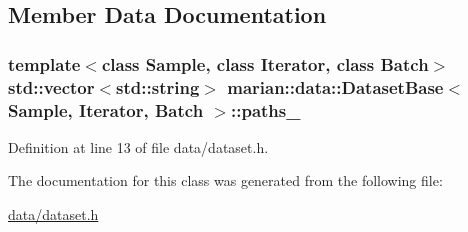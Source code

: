 \subsection{Member Data Documentation}
\subsubsection[{\texorpdfstring{paths\+\_\+}{paths_}}]{\setlength{\rightskip}{0pt plus 5cm}template$<$class Sample, class Iterator, class Batch$>$ std\+::vector$<$std\+::string$>$ {\bf marian\+::data\+::\+Dataset\+Base}$<$ Sample, Iterator, {\bf Batch} $>$\+::paths\+\_\+\hspace{0.3cm}{\ttfamily [protected]}}\hypertarget{classmarian_1_1data_1_1DatasetBase_ac00940207a65687f7ea491333aedc1c1}{}\label{classmarian_1_1data_1_1DatasetBase_ac00940207a65687f7ea491333aedc1c1}


Definition at line 13 of file data/dataset.\+h.



The documentation for this class was generated from the following file\+:\begin{DoxyCompactItemize}
\item 
\hyperlink{data_2dataset_8h}{data/dataset.\+h}\end{DoxyCompactItemize}
